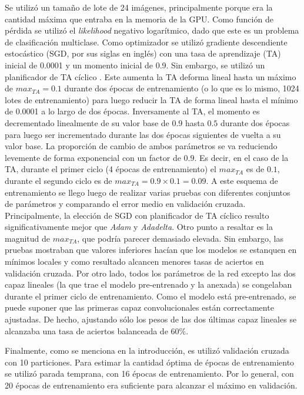 \documentclass[a4article]{article}
\begin{document}
Se utilizó un tamaño de lote de 24 imágenes, principalmente porque era la cantidad máxima que entraba en la memoria de
la GPU. Como función de pérdida se utilizó el \textit{likelihood} negativo logarítmico, dado que este es un problema de
clasificación multiclase. Como optimizador se utilizó gradiente descendiente estocástico (SGD, por sus siglas en inglés)
con una tasa de aprendizaje (TA) inicial de 0.0001 y un momento inicial de 0.9. Sin embargo, se utilizó un planificador
de TA cíclico \cite{smith2017cyclical}. Este aumenta la TA deforma lineal hasta un máximo de $max_{TA} = 0.1$ durante
dos épocas de entrenamiento (o lo que es lo mismo, 1024 lotes de entrenamiento) para luego reducir la TA de forma lineal
hasta el mínimo de 0.0001 a lo largo de dos épocas. Inversamente al TA, el momento es decrementado linealmente de su
valor base de $0.9$ hasta $0.5$ durante dos épocas para luego ser incrementado durante las dos épocas siguientes de
vuelta a su valor base. La proporción de cambio de ambos parámetros se va reduciendo levemente de forma exponencial con
un factor de $0.9$. Es decir, en el caso de la TA, durante el primer ciclo (4 épocas de entrenamiento) el $max_{TA}$ es
de $0.1$, durante el segundo ciclo es de $max_{TA}=0.9 \times 0.1=0.09$. A este esquema de entrenamiento se llego luego
de realizar varias pruebas con diferentes conjuntos de parámetros y comparando el error medio en validación cruzada.
Principalmente, la elección de SGD con planificador de TA cíclico resulto significativamente mejor que \textit{Adam} y
\textit{Adadelta}. Otro punto a resaltar es la magnitud de $max_{TA}$, que podría parecer demasiado elevada. Sin
embargo, las pruebas mostraban que valores inferiores hacían que los modelos se estanquen en mínimos locales y como
resultado alcancen menores tasas de aciertos en validación cruzada. Por otro lado, todos los parámetros de la red
excepto las dos capaz lineales (la que trae el modelo pre-entrenado y la anexada) se congelaban durante el primer ciclo
de entrenamiento. Como el modelo está pre-entrenado, se puede suponer que las primeras capaz convolucionales están
correctamente ajustadas. De hecho, ajustando sólo los pesos de las dos últimas capaz lineales se alcanzaba una tasa de
aciertos balanceada de $60\%$.

Finalmente, como se menciona en la introducción, es utilizó validación cruzada con 10 particiones. Para estimar la
cantidad óptima de épocas de entrenamiento se utilizó parada temprana, con 16 épocas de entrenamiento. Por lo general,
con 20 épocas de entrenamiento era suficiente para alcanzar el máximo en validación.



\end{document}
